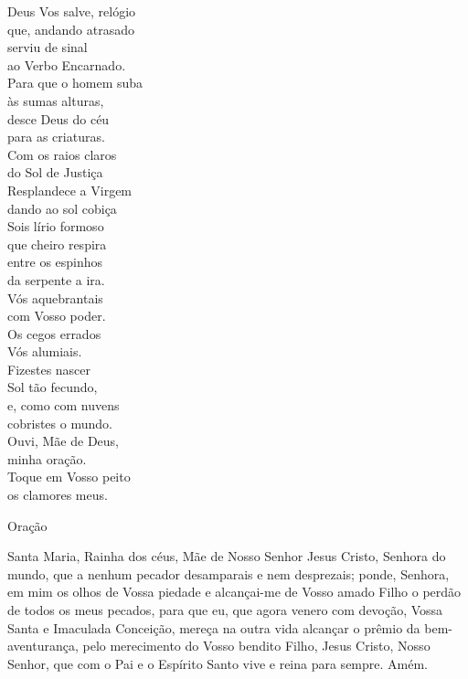 \begin{multicols}{2}\setlength{\parindent}{0pt}
    Deus Vos salve, relógio \\
    que, andando atrasado \\
    serviu de sinal \\
    ao Verbo Encarnado.
    \vspace{.2cm} \\
    Para que o homem suba \\
    às sumas alturas, \\
    desce Deus do céu \\
    para as criaturas.
    \vspace{.2cm} \\
    Com os raios claros \\
    do Sol de Justiça \\
    Resplandece a Virgem \\
    dando ao sol cobiça
    \vspace{.2cm} \\
    Sois lírio formoso \\
    que cheiro respira \\
    entre os espinhos \\
    da serpente a ira.
    \vspace{.2cm} \\
    Vós aquebrantais \\
    com Vosso poder. \\
    Os cegos errados \\
    Vós alumiais.
    \vspace{.2cm} \\
    Fizestes nascer \\
    Sol tão fecundo, \\
    e, como com nuvens \\
    cobristes o mundo.
    \vspace{.2cm} \\
    Ouvi, Mãe de Deus, \\
    minha oração. \\
    Toque em Vosso peito \\
    os clamores meus.
\end{multicols}
\begin{center}
    \textcolor{VioletRed3}{Oração}
\end{center}
\begin{flushleft}
    Santa Maria, Rainha dos céus, Mãe de Nosso Senhor Jesus Cristo, Senhora do mundo, que a nenhum pecador desamparais e nem desprezais; ponde, Senhora, em mim os olhos de Vossa piedade e alcançai-me de Vosso amado Filho o perdão de todos os meus pecados, para que eu, que agora venero com devoção, Vossa Santa e Imaculada Conceição, mereça na outra vida alcançar o prêmio da bem-aventurança, pelo merecimento do Vosso bendito Filho, Jesus Cristo, Nosso Senhor, que com o Pai e o Espírito Santo vive e reina para sempre. Amém.
\end{flushleft}
